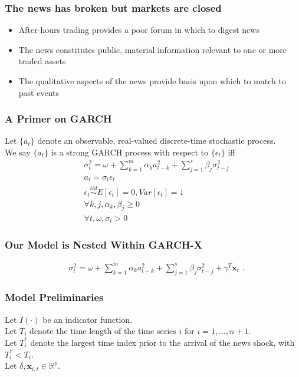 \documentclass{beamer}
\newcommand{\x}{\textbf{x}}
\newcommand{\simiid}{\stackrel{iid}{\sim}} %
\theoremstyle{definition}
\begin{document}

\begin{frame}
\frametitle{The news has broken but markets are closed}

\begin{itemize}
\item After-hours trading provides a poor forum in which to digest news
\item The news constitutes public, material information relevant to one or more traded assets
\item The qualitative aspects of the news provide basis upon which to match to past events

\end{itemize}
\end{frame}

\begin{frame}
    \frametitle{A Primer on GARCH}

    Let $\{a_{t}\}$ denote an observable, real-valued discrete-time stochastic process.\\
    

    We say $\{a_{t}\}$ is a strong GARCH process with respect to $\{\epsilon_{t}\}$ iff 
    \begin{align*}
        &\sigma_{t}^{2} = \omega + \sum^{m}_{k=1}\alpha_{k}a^{2}_{t-k} + \sum_{j=1}^{s}\beta_{j}\sigma_{t-j}^{2}\\
        &a_{t} = \sigma_{t}\epsilon_{t}\\
        &\epsilon_{t} \simiid E[\epsilon_{t}]=0, Var[\epsilon_{t}] = 1\\
        &\forall k,j, \alpha_{k},\beta_{j}\geq 0\\ 
        &\forall t, \omega, \sigma_{t} > 0 
        \end{align*}
\end{frame}

\begin{frame}
    \frametitle{Our Model is Nested Within GARCH-X}
    
    \begin{align}
        &\sigma_{t}^{2} = \omega+ \sum^{m}_{k=1}\alpha_{k}a^{2}_{t-k} + \sum_{j=1}^{s}\beta_{j}\sigma_{t-j}^{2} + \gamma^{T}\x_{t} \text{ .}\label{GARCH-X}
        \end{align}
    
    \end{frame}
    
\begin{frame}
    \frametitle{Model Preliminaries}
    Let $I(\cdot)$ be an indicator function.  \\
    
    Let $T_i$ denote the time length of the time series $i$ for $i = 1, \ldots, n+1$.\\
    
    Let $T_i^*$ denote the largest time index prior to the arrival of the news shock, with $T_i^* < T_i$. \\
    
    Let $\delta, \x_{i,t} \in \mathbb{R}^{p}$.  
\end{frame}
\end{document}
